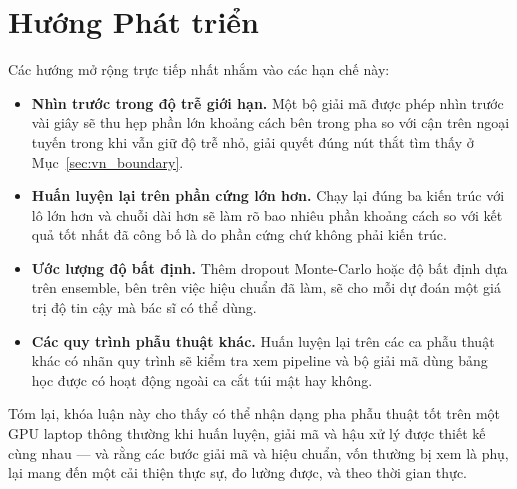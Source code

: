 \section{Hướng Phát triển}

Các hướng mở rộng trực tiếp nhất nhắm vào các hạn chế này:

\begin{itemize}
    \item \textbf{Nhìn trước trong độ trễ giới hạn.} Một bộ giải mã được phép nhìn trước vài giây sẽ thu hẹp phần lớn khoảng cách bên trong pha so với cận trên ngoại tuyến trong khi vẫn giữ độ trễ nhỏ, giải quyết đúng nút thắt tìm thấy ở Mục~\ref{sec:vn_boundary}.
    \item \textbf{Huấn luyện lại trên phần cứng lớn hơn.} Chạy lại đúng ba kiến trúc với lô lớn hơn và chuỗi dài hơn sẽ làm rõ bao nhiêu phần khoảng cách so với kết quả tốt nhất đã công bố là do phần cứng chứ không phải kiến trúc.
    \item \textbf{Ước lượng độ bất định.} Thêm dropout Monte-Carlo hoặc độ bất định dựa trên ensemble, bên trên việc hiệu chuẩn đã làm, sẽ cho mỗi dự đoán một giá trị độ tin cậy mà bác sĩ có thể dùng.
    \item \textbf{Các quy trình phẫu thuật khác.} Huấn luyện lại trên các ca phẫu thuật khác có nhãn quy trình sẽ kiểm tra xem pipeline và bộ giải mã dùng bảng học được có hoạt động ngoài ca cắt túi mật hay không.
\end{itemize}

Tóm lại, khóa luận này cho thấy có thể nhận dạng pha phẫu thuật tốt trên một GPU laptop thông thường khi huấn luyện, giải mã và hậu xử lý được thiết kế cùng nhau --- và rằng các bước giải mã và hiệu chuẩn, vốn thường bị xem là phụ, lại mang đến một cải thiện thực sự, đo lường được, và theo thời gian thực.
